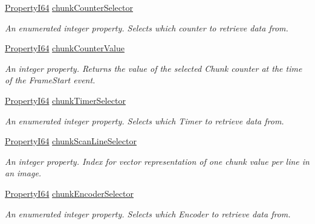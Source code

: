 \begin{DoxyCompactItemize}
\hyperlink{group___common_interface_ga81749b2696755513663492664a18a893}{Property\+I64} \hyperlink{classmv_i_m_p_a_c_t_1_1acquire_1_1_gen_i_cam_1_1_chunk_data_control_ac43d711538b1fb622260f8dc3c1cc4af}{chunk\+Counter\+Selector}
\begin{DoxyCompactList}\small\item\em An enumerated integer property. Selects which counter to retrieve data from. \end{DoxyCompactList}\item 
\hyperlink{group___common_interface_ga81749b2696755513663492664a18a893}{Property\+I64} \hyperlink{classmv_i_m_p_a_c_t_1_1acquire_1_1_gen_i_cam_1_1_chunk_data_control_a21793d389f9c7b12053027e6cef91520}{chunk\+Counter\+Value}
\begin{DoxyCompactList}\small\item\em An integer property. Returns the value of the selected Chunk counter at the time of the Frame\+Start event. \end{DoxyCompactList}\item 
\hyperlink{group___common_interface_ga81749b2696755513663492664a18a893}{Property\+I64} \hyperlink{classmv_i_m_p_a_c_t_1_1acquire_1_1_gen_i_cam_1_1_chunk_data_control_ae64defa82d79e8cc3b38aa6ff2c5e31a}{chunk\+Timer\+Selector}
\begin{DoxyCompactList}\small\item\em An enumerated integer property. Selects which Timer to retrieve data from. \end{DoxyCompactList}\item 
\hyperlink{group___common_interface_ga81749b2696755513663492664a18a893}{Property\+I64} \hyperlink{classmv_i_m_p_a_c_t_1_1acquire_1_1_gen_i_cam_1_1_chunk_data_control_a6974218ada079b8968619a5e54ea8232}{chunk\+Scan\+Line\+Selector}
\begin{DoxyCompactList}\small\item\em An integer property. Index for vector representation of one chunk value per line in an image. \end{DoxyCompactList}\item 
\hyperlink{group___common_interface_ga81749b2696755513663492664a18a893}{Property\+I64} \hyperlink{classmv_i_m_p_a_c_t_1_1acquire_1_1_gen_i_cam_1_1_chunk_data_control_a147570f20aaa1f8afa4b6da7d18a7b35}{chunk\+Encoder\+Selector}
\begin{DoxyCompactList}\small\item\em An enumerated integer property. Selects which Encoder to retrieve data from. \end{DoxyCompactList}\item 

\end{DoxyCompactItemize}
